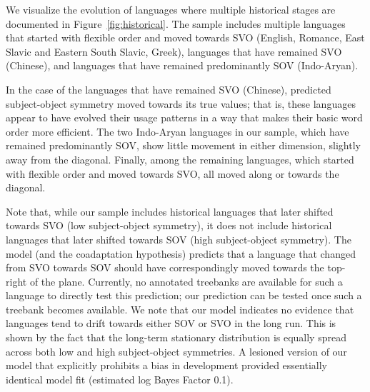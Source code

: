 \documentclass[11pt,a4paper]{article}
\newcommand\comment[1]{{\color{red}#1}}
\newcommand\mhahn[1]{{\color{red}(#1)}}
\begin{document}


We visualize the evolution of languages where multiple historical stages are documented in Figure~\ref{fig:historical}.
The sample includes multiple languages that started with flexible order and moved towards SVO (English, Romance, East Slavic and Eastern South Slavic, Greek), languages that have remained SVO (Chinese), and languages that have remained predominantly SOV (Indo-Aryan).

In the case of the languages that have remained SVO (Chinese), predicted subject-object symmetry moved towards its true values; that is, these languages appear to have evolved their usage patterns in a way that makes their basic word order more efficient.
The two Indo-Aryan languages in our sample, which have remained predominantly SOV, show little movement in either dimension, slightly away from the diagonal.
Finally, among the remaining languages, which started with flexible order and moved towards SVO, all moved along or towards the diagonal.



Note that, while our sample includes historical languages that later shifted towards SVO (low subject-object symmetry), it does not include historical languages that later shifted towards SOV (high subject-object symmetry).
The model (and the coadaptation hypothesis) predicts that a language that changed from SVO towards SOV should have correspondingly moved towards the top-right of the plane. 
Currently, no annotated treebanks are available for such a language to directly test this prediction; our prediction can be tested once such a treebank becomes available.
We note that our model indicates no evidence that languages tend to drift towards either SOV or SVO in the long run.
This is shown by the fact that the long-term stationary distribution is equally spread across both low and high subject-object symmetries.
A lesioned version of our model that explicitly prohibits a bias in development provided essentially identical model fit (estimated log Bayes Factor 0.1).
\end{document}
